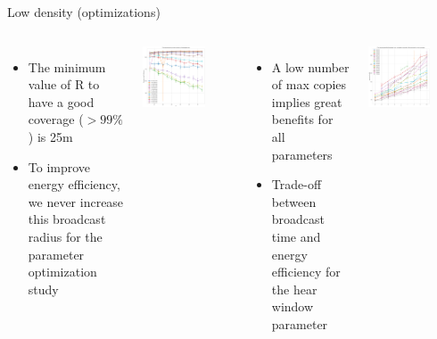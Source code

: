 \documentclass[aspectratio=169]{beamer}
\begin{document}
\begin{frame}{Low density (optimizations)}
	\footnotesize
	\begin{columns}
	        \begin{itemize}
	        \item The minimum value of R to have a good coverage (\(> 99\%\)) is 25m
	        \item To improve energy efficiency, we never increase this broadcast radius for the parameter optimization study
	        \end{itemize}
	        \begin{center}
	            \includegraphics[width=0.7\textwidth]{img/ld/messages-R-ffplot.png}
	        \end{center}
	        \begin{itemize}
	        \item A low number of max copies implies great benefits for all parameters
	        \item Trade-off between broadcast time and energy efficiency for the hear window parameter
	        \end{itemize}
	        \begin{center}
	            \includegraphics[width=0.7\textwidth]{img/ld/broadcasttime-T-ffplot.png}
	        \end{center}
	\end{columns}
\end{frame}
\end{document}
